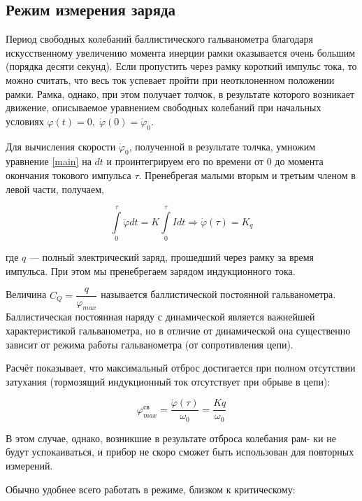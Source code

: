 \documentclass[12pt,a4paper]{article}
\begin{document}
\subsection*{Режим измерения заряда}
	
	Период свободных колебаний баллистического гальванометра благодаря искусственному увеличению момента инерции рамки оказывается очень большим (порядка десяти секунд). Если пропустить через рамку короткий импульс тока, то можно считать, что весь ток успевает пройти при неотклоненном положении рамки. Рамка, однако, при этом получает толчок, в результате которого возникает движение, описываемое уравнением свободных колебаний при начальных условиях $\varphi(t) = 0, \; \dot{\varphi }(0) = \dot{\varphi }_0$.

	Для вычисления скорости $ \dot{\varphi }_0 $, полученной в результате толчка, умножим уравнение \eqref{main} на $ dt $ и проинтегрируем его по времени от 0 до момента окончания токового импульса $ \tau $. Пренебрегая малыми вторым и третьим членом в левой части, получаем,
	
	\begin{equation}
	   \int\limits_0^\tau \ddot{\varphi}dt = K 	\int\limits_0^\tau I dt \Rightarrow \dot{\varphi }(\tau) = K_q
	\end{equation}
	
	где $q$ --- полный электрический заряд, прошедший через рамку за время импульса. При этом мы пренебрегаем зарядом индукционного тока.
	
	
	Величина $ C_Q = \dfrac{q}{\varphi_{max}}$ называется баллистической постоянной гальванометра. Баллистическая постоянная наряду с динамической является важнейшей характеристикой гальванометра, но в отличие от динамической она существенно зависит от режима работы гальванометра (от сопротивления цепи).
	
	Расчёт показывает, что максимальный отброс достигается при полном
	отсутствии затухания (тормозящий индукционный ток отсутствует при
	обрыве в цепи):
	
	\begin{equation}\label{}
	\varphi_{max}^\text{св} = \dfrac{\dot{\varphi }(\tau) }{\omega_0} = \dfrac{Kq}{\omega_0}
	\end{equation}
	
	В этом случае, однако, возникшие в результате отброса колебания рам-
	ки не будут успокаиваться, и прибор не скоро сможет быть использован
	для повторных измерений.
	
	Обычно удобнее всего работать в режиме, близком к критическому:
	
\end{document}
